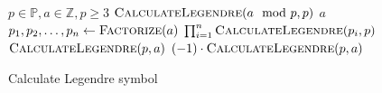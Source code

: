 \documentclass{article}
\begin{document}
\begin{preview}
    \begin{algorithm}[H]
        \begin{algorithmic}
        \Require $p \in \mathbb{P}, a \in \mathbb{Z}, p \geq 3$
				\State \Return $\Call{CalculateLegendre}{a \mod p, p}$ 
				\State \Return $a$ 
			 
					\State {}
				\Else
					\State {}
				\EndIf	{}
			 
					\State {}
				\Else
					\State {}
				\EndIf {}
			 
				\State $p_1, p_2, \dots, p_n \gets \Call{Factorize}{a}$
				\State \Return $\prod_{i=1}^n \Call{CalculateLegendre}{p_i, p}$ 
			\Else {}
					\State \Return $\Call{CalculateLegendre}{p, a}$
				\Else
					\State \Return $(-1) \cdot \Call{CalculateLegendre}{p, a}$
				\EndIf
			\EndIf
		\EndProcedure
        \end{algorithmic}
    \caption{Calculate Legendre symbol}
    \label{alg:calculateLegendreSymbol}
    \end{algorithm}
\end{preview}
\end{document}
